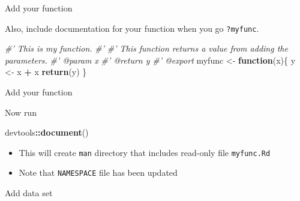 \documentclass[
  ignorenonframetext,
]{beamer}
\newenvironment{Shaded}{\begin{snugshade}}{\end{snugshade}}
\newcommand{\CommentTok}[1]{\textcolor[rgb]{0.56,0.35,0.01}{\textit{#1}}}
\newcommand{\ControlFlowTok}[1]{\textcolor[rgb]{0.13,0.29,0.53}{\textbf{#1}}}
\newcommand{\KeywordTok}[1]{\textcolor[rgb]{0.13,0.29,0.53}{\textbf{#1}}}
\newcommand{\NormalTok}[1]{#1}
\newcommand{\OperatorTok}[1]{\textcolor[rgb]{0.81,0.36,0.00}{\textbf{#1}}}
\newcommand{\StringTok}[1]{\textcolor[rgb]{0.31,0.60,0.02}{#1}}
\providecommand{\tightlist}{%
  \setlength{\itemsep}{0pt}\setlength{\parskip}{0pt}}
\begin{document}
\begin{frame}[fragile]{Add your function}
\protect\hypertarget{add-your-function-2}{}

Also, include documentation for your function when you go
\texttt{?myfunc}. \small

\begin{Shaded}
\begin{Highlighting}[]
\CommentTok{#' This is my function.}
\CommentTok{#'}
\CommentTok{#' This function returns a value from adding the parameters.}
\CommentTok{#' @param x}
\CommentTok{#' @return y}
\CommentTok{#' @export}
\NormalTok{myfunc <-}\StringTok{ }\ControlFlowTok{function}\NormalTok{(x)\{}
\NormalTok{  y <-}\StringTok{ }\NormalTok{x }\OperatorTok{+}\StringTok{ }\NormalTok{x}
  \KeywordTok{return}\NormalTok{(y)}
\NormalTok{\}}
\end{Highlighting}
\end{Shaded}

\end{frame}

\begin{frame}[fragile]{Add your function}
\protect\hypertarget{add-your-function-3}{}

Now run

\begin{Shaded}
\begin{Highlighting}[]
\NormalTok{devtools}\OperatorTok{::}\KeywordTok{document}\NormalTok{()}
\end{Highlighting}
\end{Shaded}

\begin{itemize}
\tightlist
\item
  This will create \texttt{man} directory that includes read-only file
  \texttt{myfunc.Rd}
\item
  Note that \texttt{NAMESPACE} file has been updated
\end{itemize}

\end{frame}

\begin{frame}{Add data set}
\protect\hypertarget{add-data-set}{}

\end{frame}
\end{document}
